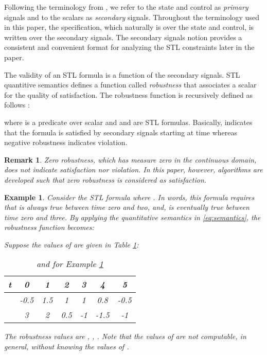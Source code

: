 \documentclass[letterpaper, 10 pt, conference]{ieeeconf}
\newtheorem{example}{Example}
\newtheorem{remark}{Remark}
\begin{document}
Following the terminology from \cite{donze}, we refer to the state and control as \emph{primary} signals and to the scalars  as  \emph{secondary} signals. Throughout the terminology used in this paper, the specification, which naturally is over the state and control, is written over the secondary signals. The secondary signals notion provides a consistent and convenient format for analyzing the STL constraints later in the paper. 

The validity of an STL formula is a function of the secondary signals. STL quantitive semantics defines a function called \emph{robustness} that associates a scalar for the quality of satisfaction. The robustness function is recursively defined as follows \cite{donze}:

where  is a predicate over scalar  and  and  are STL formulas. Basically,  indicates that the formula  is satisfied by secondary signals starting at time  whereas negative robustness indicates violation.
\begin{remark}Zero robustness, which has measure zero in the continuous domain, does not indicate satisfaction nor violation. In this paper, however, algorithms are developed such that zero robustness is considered as satisfaction.
 \end{remark}

\begin{example}
\label{example:system}
Consider the STL formula  where . In words, this formula requires that  is always true between time zero and two, \emph{and},  is eventually true between time zero and three. By applying the quantitative semantics in \eqref{eq:semantics}, the robustness function becomes: 

Suppose the values of  are given in Table \ref{table:signals}:
\begin{table}[H]
\begin{center}
   \caption{ and  for Example \ref{example:system}}
          \label{table:signals}

  \begin{tabular}{ | l | *{6}{c}  | }
    \hline
    t & 0 & 1 & 2 & 3 & 4 & 5 \\ \hline
     & -0.5 & 1.5 & 1 & 1 & 0.8 & -0.5 \\ \hline
     & 3 & 2 & 0.5 & -1 & -1.5 & -1 \\
    \hline
  \end{tabular}
   \end{center}

\end{table}
The robustness values are , , . Note that the values of  are not computable, in general, without knowing the values of .

\endproof



\end{example}
\end{document}

